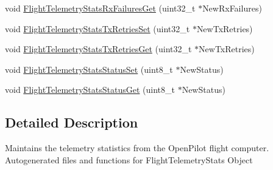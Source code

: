 \begin{DoxyCompactItemize}
void \hyperlink{group___flight_telemetry_stats_gad69713ce78b440d6736e30e9ee9d3945}{\-Flight\-Telemetry\-Stats\-Rx\-Failures\-Get} (uint32\-\_\-t $\ast$\-New\-Rx\-Failures)
\item 
void \hyperlink{group___flight_telemetry_stats_gab05d36e7a87e6b8fdf4a6c4dabc8126b}{\-Flight\-Telemetry\-Stats\-Tx\-Retries\-Set} (uint32\-\_\-t $\ast$\-New\-Tx\-Retries)
\item 
void \hyperlink{group___flight_telemetry_stats_ga84d49ebf482c54e4787fc569f81c7441}{\-Flight\-Telemetry\-Stats\-Tx\-Retries\-Get} (uint32\-\_\-t $\ast$\-New\-Tx\-Retries)
\item 
void \hyperlink{group___flight_telemetry_stats_ga8335a9b560bc9e9d243a55ebdb3dbf89}{\-Flight\-Telemetry\-Stats\-Status\-Set} (uint8\-\_\-t $\ast$\-New\-Status)
\item 
void \hyperlink{group___flight_telemetry_stats_gac039dc71f50243b16ef46c862a0c0fc3}{\-Flight\-Telemetry\-Stats\-Status\-Get} (uint8\-\_\-t $\ast$\-New\-Status)
\end{DoxyCompactItemize}


\subsection{\-Detailed \-Description}
\-Maintains the telemetry statistics from the \-Open\-Pilot flight computer. \-Autogenerated files and functions for \-Flight\-Telemetry\-Stats \-Object 

